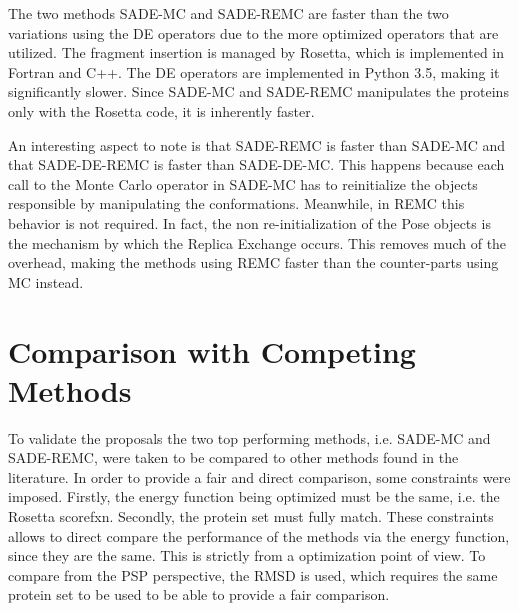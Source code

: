 The two methods SADE-MC and SADE-REMC are faster than the two variations using the DE operators
due to the more optimized operators that are utilized. The fragment insertion is managed by
Rosetta, which is implemented in Fortran and C++. The DE operators are implemented in Python 3.5,
making it significantly slower. Since SADE-MC and SADE-REMC manipulates the proteins only with 
the Rosetta code, it is inherently faster.


An interesting aspect to note is that SADE-REMC is faster than SADE-MC and that SADE-DE-REMC is
faster than SADE-DE-MC. This happens because each call to the Monte Carlo operator in SADE-MC
has to reinitialize the objects responsible by manipulating the conformations. Meanwhile,
in REMC this behavior is not required. In fact, the non re-initialization of the Pose objects is the mechanism by which the Replica Exchange occurs. This removes much of the overhead,
making the methods using REMC faster than the counter-parts using MC instead.


\section{Comparison with Competing Methods}

To validate the proposals the two top performing methods, i.e. SADE-MC and SADE-REMC, were taken to be compared to other methods found in the literature. In order to provide a fair and direct comparison, some constraints were imposed. Firstly, the energy function being optimized must be the same, i.e. the Rosetta scorefxn. Secondly, the protein set must fully match. These constraints allows to direct compare the performance of the methods via the energy function, since they are the same. This is strictly from a optimization point of view. To compare from the PSP perspective, the \ac{RMSD} is used, which requires the same protein set
to be used to be able to provide a fair comparison.

